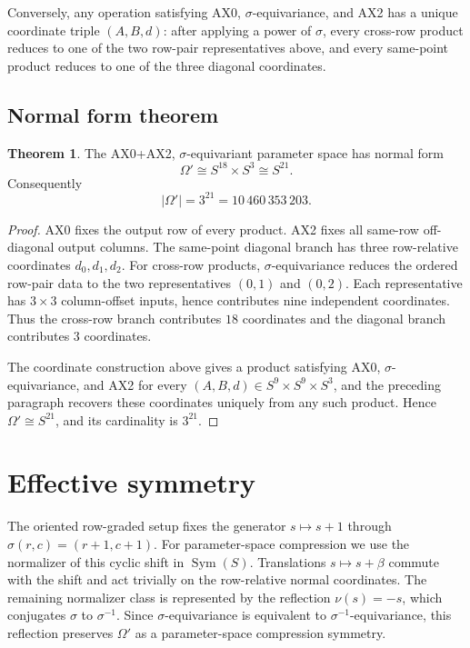 \documentclass[11pt]{article}
\theoremstyle{definition}
\newtheorem{theorem}{Theorem}[section]
\begin{document}
Conversely, any operation satisfying AX0, \(\sigma\)-equivariance, and AX2
has a unique coordinate triple \((A,B,d)\): after applying a power of
\(\sigma\), every cross-row product reduces to one of the two row-pair
representatives above, and every same-point product reduces to one of the
three diagonal coordinates.

\subsection{Normal form theorem}\label{normal-form-theorem}

\begin{theorem}
\label{thm:1.1}
The AX0+AX2, \(\sigma\)-equivariant parameter space has normal form
\[
\Omega'\cong S^{18}\times S^3\cong S^{21}.
\]
Consequently
\[
|\Omega'|=3^{21}=10\,460\,353\,203.
\]
\end{theorem}

\begin{proof}
AX0 fixes the output row of every product.  AX2 fixes all same-row
off-diagonal output columns.  The same-point diagonal branch has three
row-relative coordinates \(d_0,d_1,d_2\).  For cross-row products,
\(\sigma\)-equivariance reduces the ordered row-pair data to the two
representatives \((0,1)\) and \((0,2)\).  Each representative has
\(3\times3\) column-offset inputs, hence contributes nine independent
coordinates.  Thus the cross-row branch contributes \(18\) coordinates and
the diagonal branch contributes \(3\) coordinates.

The coordinate construction above gives a product satisfying AX0,
\(\sigma\)-equivariance, and AX2 for every \((A,B,d)\in S^9\times S^9
\times S^3\), and the preceding paragraph recovers these coordinates
uniquely from any such product.  Hence \(\Omega'\cong S^{21}\), and its
cardinality is \(3^{21}\).
\end{proof}


\section{Effective symmetry}\label{effective-symmetry}\label{effective-symmetry-and-orbit-count}

The oriented row-graded setup fixes the generator
\(s\mapsto s+1\) through
\(\sigma(r,c)=(r+1,c+1)\).  For parameter-space compression we use the normalizer of this cyclic shift in
\(\operatorname{Sym}(S)\).  Translations
\(s\mapsto s+\beta\) commute with the shift and act trivially on the
row-relative normal coordinates.  The remaining normalizer class is
represented by the reflection \(\nu(s)=-s\), which conjugates
\(\sigma\) to \(\sigma^{-1}\).  Since \(\sigma\)-equivariance is equivalent
to \(\sigma^{-1}\)-equivariance, this reflection preserves \(\Omega'\) as a
parameter-space compression symmetry.
\end{document}
